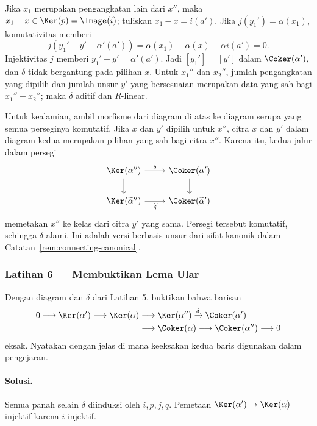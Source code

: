 Jika $x_1$ merupakan pengangkatan lain dari $x''$, maka
$x_1-x\in\Ker(p)=\Image(i)$; tuliskan $x_1-x=i(a')$. Jika
$j(y_1')=\alpha(x_1)$, komutativitas memberi
\[
	j(y_1'-y'-\alpha'(a'))
	=\alpha(x_1)-\alpha(x)-\alpha i(a')=0.
\]
Injektivitas $j$ memberi $y_1'-y'=\alpha'(a')$. Jadi
$[y_1']=[y']$ dalam $\Coker(\alpha')$, dan $\delta$ tidak bergantung pada
pilihan $x$. Untuk $x_1''$ dan $x_2''$, jumlah pengangkatan yang dipilih dan
jumlah unsur $y'$ yang bersesuaian merupakan data yang sah bagi
$x_1''+x_2''$; maka
$\delta$ aditif dan $R$-linear.

Untuk kealamian, ambil morfisme dari diagram di atas ke diagram serupa yang
semua perseginya komutatif. Jika $x$ dan $y'$ dipilih untuk $x''$, citra
$x$ dan $y'$ dalam diagram kedua merupakan pilihan yang sah bagi citra $x''$.
Karena itu, kedua jalur dalam persegi
\[
\begin{tikzcd}
	\Ker(\alpha'') \arrow[r, "\delta"] \arrow[d] & \Coker(\alpha') \arrow[d] \\
	\Ker(\widetilde\alpha'') \arrow[r, "\widetilde\delta"'] & \Coker(\widetilde\alpha')
\end{tikzcd}
\]
memetakan $x''$ ke kelas dari citra $y'$ yang sama. Persegi tersebut
komutatif, sehingga $\delta$ alami. Ini adalah versi berbasis unsur dari sifat
kanonik dalam Catatan~\ref{rem:connecting-canonical}.

\subsubsection*{Latihan 6 --- Membuktikan Lema Ular}
\hypertarget{o014.mastery.diagram-chasing.001.ex06}{ }
\label{mastery:diagram-chasing-001-ex06}

Dengan diagram dan $\delta$ dari Latihan 5, buktikan bahwa barisan
\[
\begin{aligned}
	0 \longrightarrow \Ker(\alpha') \longrightarrow \Ker(\alpha)
	&\longrightarrow \Ker(\alpha'') \xrightarrow{\delta}
	\Coker(\alpha') \\
	&\longrightarrow \Coker(\alpha)
	\longrightarrow \Coker(\alpha'') \longrightarrow 0
\end{aligned}
\]
eksak. Nyatakan dengan jelas di mana keeksakan kedua baris digunakan dalam
pengejaran.

\paragraph{Solusi.}
\hypertarget{o014.mastery.diagram-chasing.001.sol06}{ }
Semua panah selain $\delta$ diinduksi oleh $i,p,j,q$. Pemetaan
$\Ker(\alpha')\to\Ker(\alpha)$ injektif karena $i$ injektif.

